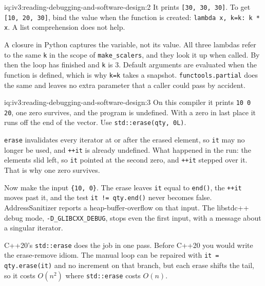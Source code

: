 \begin{solution}{iq:iv3:reading-debugging-and-software-design:2}
It prints \texttt{[30, 30, 30]}. To get \texttt{[10, 20, 30]}, bind the value when the function is created: \texttt{lambda x, k=k: k * x}. A list comprehension does not help.

A closure in Python captures the variable, not its value. All three lambdas refer to the same \texttt{k} in the scope of \texttt{make\_scalers}, and they look it up when called. By then the loop has finished and \texttt{k} is 3. Default arguments are evaluated when the function is defined, which is why \texttt{k=k} takes a snapshot. \texttt{functools.partial} does the same and leaves no extra parameter that a caller could pass by accident.


\end{solution}

\begin{solution}{iq:iv3:reading-debugging-and-software-design:3}
On this compiler it prints \texttt{10 0 20}, one zero survives, and the program is undefined. With a zero in last place it runs off the end of the vector. Use \texttt{std::erase(qty, 0L)}.

\texttt{erase} invalidates every iterator at or after the erased element, so \texttt{it} may no longer be used, and \texttt{++it} is already undefined. What happened in the run: the elements slid left, so \texttt{it} pointed at the second zero, and \texttt{++it} stepped over it. That is why one zero survives.

Now make the input \texttt{\{10, 0\}}. The erase leaves \texttt{it} equal to \texttt{end()}, the \texttt{++it} moves past it, and the test \texttt{it != qty.end()} never becomes false. AddressSanitizer reports a heap-buffer-overflow on that input. The libstdc++ debug mode, \texttt{-D\_GLIBCXX\_DEBUG}, stops even the first input, with a message about a singular iterator.

C++20's \texttt{std::erase} does the job in one pass. Before C++20 you would write the erase-remove idiom. The manual loop can be repaired with \texttt{it = qty.erase(it)} and no increment on that branch, but each erase shifts the tail, so it costs $O(n^2)$ where \texttt{std::erase} costs $O(n)$.


\end{solution}

